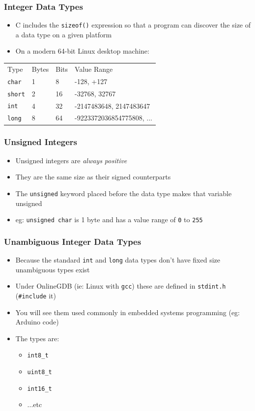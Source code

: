 \documentclass[14pt]{beamer}
\begin{document}
\begin{frame}
\frametitle{Integer Data Types}
\begin{itemize}
\item C includes the \texttt{sizeof()} expression so that a program can discover the size of a data type on a given platform
\item On a modern 64-bit Linux desktop machine:
\end{itemize}
\begin{table}[]
\begin{tabular}{llll}
Type & Bytes & Bits & Value Range                               \\
\texttt{char}      & 1            & 8           & -128, +127                                \\
\texttt{short}     & 2            & 16          & -32768, 32767      \\
\texttt{int}       & 4            & 32          & -2147483648, 2147483647                   \\
\texttt{long}      & 8            & 64          & -9223372036854775808, ...
\end{tabular}
\end{table}
\end{frame}

\begin{frame}
\frametitle{Unsigned Integers}
\begin{itemize}
\item Unsigned integers are \textit{always positive}
\item They are the same size as their signed counterparts
\item The \texttt{unsigned} keyword placed before the data type makes that variable unsigned
\item eg: \texttt{unsigned char} is 1 byte and has a value range of \texttt{0} to \texttt{255}
\end{itemize}
\end{frame}

\begin{frame}
\frametitle{Unambiguous Integer Data Types}
\begin{itemize}
\item Because the standard \texttt{int} and \texttt{long} data types don't have fixed size unambiguous types exist
\item Under OnlineGDB (ie: Linux with \texttt{gcc}) these are defined in \texttt{stdint.h} (\texttt{\#include} it)
\item You will see them used commonly in embedded systems programming (eg: Arduino code)
\item The types are:
	\begin{itemize}
		\item \texttt{int8\_t}
		\item \texttt{uint8\_t}
		\item \texttt{int16\_t}
		\item ...etc
	\end{itemize}
\end{itemize}
\end{frame}
\end{document}
